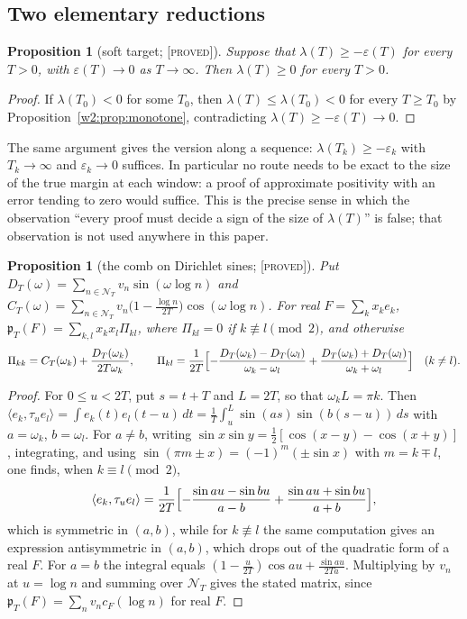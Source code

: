 \documentclass[11pt]{amsart}
\newtheorem{proposition}[theorem]{Proposition}
\theoremstyle{definition}
\theoremstyle{remark}
\numberwithin{equation}{section}
\newcommand{\cF}{c_F}                                  %
\newcommand{\NT}{\mathcal{N}_T}                        %
\newcommand{\pT}{\mathfrak{p}_T}                       %
\newcommand{\lam}{\lambda(T)}                          %
\newcommand{\stag}[1]{\textsc{[#1]}}
\newcommand{\PROVED}{\stag{proved}}
\begin{document}
\subsection{Two elementary reductions}

\begin{proposition}[soft target; \PROVED]\label{w2:prop:soft}
Suppose that $\lam\ge-\varepsilon(T)$ for every $T>0$, with $\varepsilon(T)\to0$ as $T\to\infty$. Then $\lam\ge0$ for
every $T>0$.
\end{proposition}

\begin{proof}
If $\lambda(T_0)<0$ for some $T_0$, then $\lam\le\lambda(T_0)<0$ for every $T\ge T_0$ by
Proposition~\ref{w2:prop:monotone}, contradicting $\lam\ge-\varepsilon(T)\to0$.
\end{proof}

The same argument gives the version along a sequence: $\lambda(T_k)\ge-\varepsilon_k$ with $T_k\to\infty$ and
$\varepsilon_k\to0$ suffices. In particular no route needs to be exact to the size of the true margin at each window: a
proof of approximate positivity with an error tending to zero would suffice. This is the precise sense in which the
observation ``every proof must decide a sign of the size of $\lam$'' is false; that observation is not used anywhere in this paper.

\begin{proposition}[the comb on Dirichlet sines; \PROVED]\label{w2:prop:combsine}
Put $D_T(\omega)=\sum_{n\in\NT}v_n\sin(\omega\log n)$ and
$C_T(\omega)=\sum_{n\in\NT}v_n\bigl(1-\frac{\log n}{2T}\bigr)\cos(\omega\log n)$. For real $F=\sum_kx_ke_k$,
$\pT(F)=\sum_{k,l}x_kx_l\Pi_{kl}$, where $\Pi_{kl}=0$ if $k\not\equiv l\pmod 2$, and otherwise
\[
\Pi_{kk}=C_T(\omega_k)+\frac{D_T(\omega_k)}{2T\omega_k},\qquad
\Pi_{kl}=\frac1{2T}\Bigl[-\frac{D_T(\omega_k)-D_T(\omega_l)}{\omega_k-\omega_l}+\frac{D_T(\omega_k)+D_T(\omega_l)}{\omega_k+\omega_l}\Bigr]
\quad(k\ne l).
\]
\end{proposition}

\begin{proof}
For $0\le u<2T$, put $s=t+T$ and $L=2T$, so that $\omega_kL=\pi k$. Then
$\langle e_k,\tau_ue_l\rangle=\int e_k(t)e_l(t-u)\,dt=\frac1T\int_u^L\sin(as)\sin(b(s-u))\,ds$ with $a=\omega_k$,
$b=\omega_l$. For $a\ne b$, writing $\sin x\sin y=\frac12[\cos(x-y)-\cos(x+y)]$, integrating, and using
$\sin(\pi m\pm x)=(-1)^m(\pm\sin x)$ with $m=k\mp l$, one finds, when $k\equiv l\pmod2$,
\[
\langle e_k,\tau_ue_l\rangle=\frac1{2T}\Bigl[-\frac{\sin au-\sin bu}{a-b}+\frac{\sin au+\sin bu}{a+b}\Bigr],
\]
which is symmetric in $(a,b)$, while for $k\not\equiv l$ the same computation gives an expression antisymmetric in
$(a,b)$, which drops out of the quadratic form of a real $F$. For $a=b$ the integral equals
$(1-\frac u{2T})\cos au+\frac{\sin au}{2Ta}$. Multiplying by $v_n$ at $u=\log n$ and summing over $\NT$ gives the
stated matrix, since $\pT(F)=\sum_nv_n\cF(\log n)$ for real $F$.
\end{proof}
\end{document}
